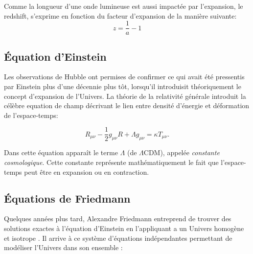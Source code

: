 Comme la longueur d'une onde lumineuse est aussi impactée par l'expansion, le redshift, s'exprime en fonction du facteur d'expansion de la manière suivante:
\begin{equation}
z= \frac{1}{a}-1
\end{equation}

\subsection{Équation d'Einstein}

Les observations de Hubble ont permises de confirmer ce qui avait été pressentis par Einstein plus d'une décennie plus tôt, lorsqu'il introduisit théoriquement le concept d'expansion de l'Univers. 
La théorie de la relativité générale \citep{1916AnP...354..769E} introduit la célèbre equation de champ décrivant le lien entre densité d'énergie et déformation de l'espace-temps:

\begin{equation}
R_{\mu\nu} - \frac{1}{2} g_{\mu\nu}R + \Lambda g_{\mu\nu}  = \kappa T_{\mu\nu}.
\label{eq:einstein}
\end{equation} 

Dans cette équation apparaît le terme $\Lambda$ (de $\Lambda$CDM), appelée \textit{constante cosmologique}.
Cette constante représente mathématiquement le fait que l'espace-temps peut être en expansion ou en contraction.

\subsection{Équations de Friedmann}
\label{sec:friedman}

Quelques années plus tard, Alexandre Friedmann entreprend de trouver des solutions exactes à l'équation d'Einstein en l'appliquant a un Univers homogène et isotrope \citep{1922ZPhy...10..377F}.
Il arrive à ce système d'équations indépendantes permettant de modéliser l'Univers dans son ensemble :

% 
%
% 
 
